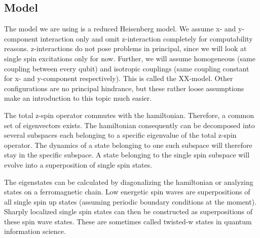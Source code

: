 \subsection{Model}

\begin{center}
\end{center}

\noindent The model we are using is a reduced Heisenberg model. We assume x- and y-component interaction only and omit z-interaction completely for computability reasons. z-interactions do not pose problems in principal, since we will look at single spin excitations only for now. Further, we will assume homogeneous (same coupling between every qubit) and isotropic couplings (same coupling constant for x- and y-component respectively). This is called the XX-model. Other configurations are no principal hindrance, but these rather loose assumptions make an introduction to this topic much easier.\par
The total z-spin operator commutes with the hamiltonian. Therefore, a common set of eigenvectors exists. The hamiltonian consequently can be decomposed into several subspaces each belonging to a specific eigenvalue of the total z-spin operator. The dynamics of a state belonging to one such subspace will therefore stay in the specific subspace. A state belonging to the single spin subspace will evolve into a superposition of single spin states.\par
The eigenstates can be calculated by diagonalizing the hamiltonian or analyzing states on a ferromagnetic chain\cite{Stolze2014}. Low energetic spin waves are superpositions of all single spin up states (assuming periodic boundary conditions at the moment). Sharply localized single spin states can then be constructed as superpositions of these spin wave states. These are sometimes called twisted-w states in quantum information science\cite{Osborne2004}. 


